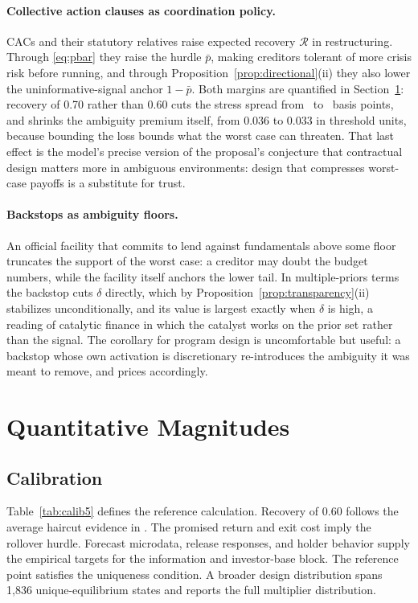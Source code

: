 \documentclass[11pt]{article}
\theoremstyle{definition}
\begin{document}
\paragraph{Collective action clauses as coordination policy.} CACs and their statutory relatives raise expected recovery $\mathcal{R}$ in restructuring. Through \eqref{eq:pbar} they raise the hurdle $\bar p$, making creditors tolerant of more crisis risk before running, and through Proposition~\ref{prop:directional}(ii) they also lower the uninformative-signal anchor $1 - \bar p$. Both margins are quantified in Section~\ref{sec:quant}: recovery of 0.70 rather than 0.60 cuts the stress spread from \CACSBase\ to \CACSNew\ basis points, and shrinks the ambiguity premium itself, from 0.036 to 0.033 in threshold units, because bounding the loss bounds what the worst case can threaten. That last effect is the model's precise version of the proposal's conjecture that contractual design matters more in ambiguous environments: design that compresses worst-case payoffs is a substitute for trust.

\paragraph{Backstops as ambiguity floors.} An official facility that commits to lend against fundamentals above some floor truncates the support of the worst case: a creditor may doubt the budget numbers, while the facility itself anchors the lower tail. In multiple-priors terms the backstop cuts $\delta$ directly, which by Proposition~\ref{prop:transparency}(ii) stabilizes unconditionally, and its value is largest exactly when $\delta$ is high, a reading of catalytic finance \citep{MorrisShin2006} in which the catalyst works on the prior set rather than the signal. The corollary for program design is uncomfortable but useful: a backstop whose own activation is discretionary re-introduces the ambiguity it was meant to remove, and prices accordingly.

\section{Quantitative Magnitudes}\label{sec:quant}

\subsection{Calibration}

Table~\ref{tab:calib5} defines the reference calculation. Recovery of 0.60 follows the average haircut evidence in \citet{CrucesTrebesch2013}. The promised return and exit cost imply the rollover hurdle. Forecast microdata, release responses, and holder behavior supply the empirical targets for the information and investor-base block. The reference point satisfies the uniqueness condition. A broader design distribution spans 1,836 unique-equilibrium states and reports the full multiplier distribution.
\end{document}
